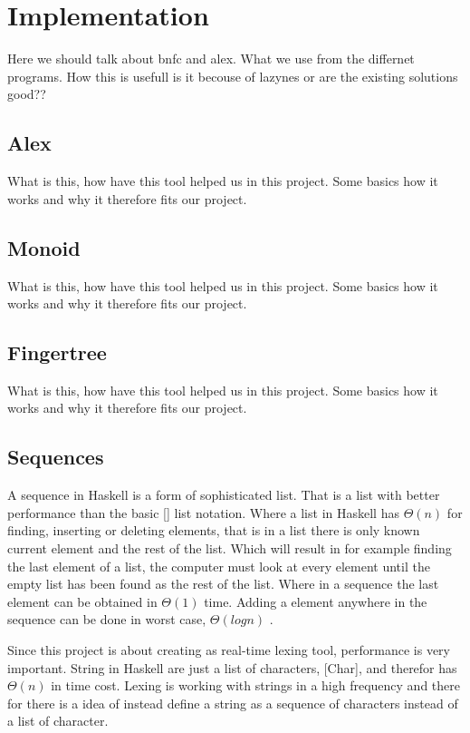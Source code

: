 \chapter{Implementation}
Here we should talk about bnfc and
alex. What we use from the differnet programs. How this is usefull
is it becouse of lazynes or are the existing solutions good??

\section{Alex}
What is this, how have this tool helped us in this project.
Some basics how it works and why it therefore fits our project.

\section{Monoid}
What is this, how have this tool helped us in this project.
Some basics how it works and why it therefore fits our project.

\section{Fingertree}
What is this, how have this tool helped us in this project.
Some basics how it works and why it therefore fits our project.

\section{Sequences}
A sequence in Haskell is a form of sophisticated list. That is a list with better performance than the basic [] list notation. Where a list in Haskell has $\Theta(n)$ for finding, inserting or deleting elements, that is in a list there is only known current element and the rest of the list. Which will result in for example finding the last element of a list, the computer must look at every element until the empty list has been found as the rest of the list. Where in a sequence the last element can be obtained in $\Theta(1)$ time. Adding a element anywhere in the sequence can be done in worst case, $\Theta(log n)$ \cite{fingertree}. 

Since this project is about creating as real-time lexing tool, performance is very important. String in Haskell are just a list of characters, [Char], and therefor has $\Theta(n)$ in time cost. Lexing is working with strings in a high frequency and there for there is a idea of instead define a string as a sequence of characters instead of a list of character. 
